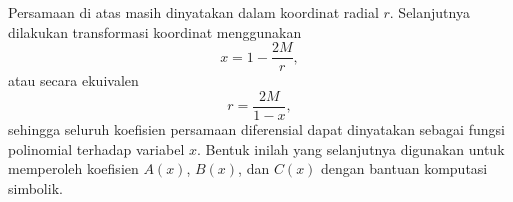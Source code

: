 Persamaan di atas masih dinyatakan dalam koordinat radial $r$. Selanjutnya dilakukan transformasi koordinat menggunakan
\begin{equation}
    x=1-\frac{2M}{r},
\end{equation}
atau secara ekuivalen
\begin{equation}
    r=\frac{2M}{1-x},
\end{equation}
sehingga seluruh koefisien persamaan diferensial dapat dinyatakan sebagai fungsi polinomial terhadap variabel $x$. Bentuk inilah yang selanjutnya digunakan untuk memperoleh koefisien $A(x)$, $B(x)$, dan $C(x)$ dengan bantuan komputasi simbolik.
